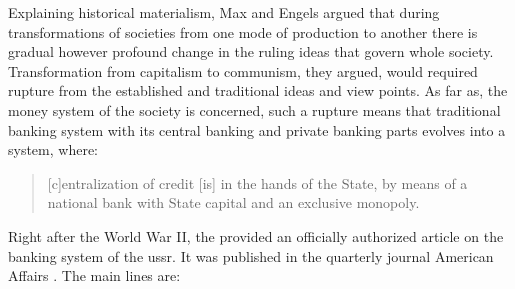 \newpage

Explaining historical materialism, Max and Engels argued that during transformations of societies from one mode of production to another there is gradual however profound change in the ruling ideas that govern whole society. Transformation from capitalism to communism, they argued, would required rupture from the established and traditional ideas and view points. As far as, the money system of the society is concerned, such a rupture means that traditional banking system with its central banking and private banking parts evolves into a system, where:

\begin{quote}
[c]entralization of credit [is] in the hands of the State, by means of a national bank with State capital and an exclusive monopoly. \citep[p.~26]{marx_communist_2008}
\end{quote}

Right after the World War II, the \citeauthor{AA1946} provided an officially authorized article on the banking system of the \ac{ussr}. It was published in the quarterly journal American Affairs \citep{AA1946}. The main lines are:

